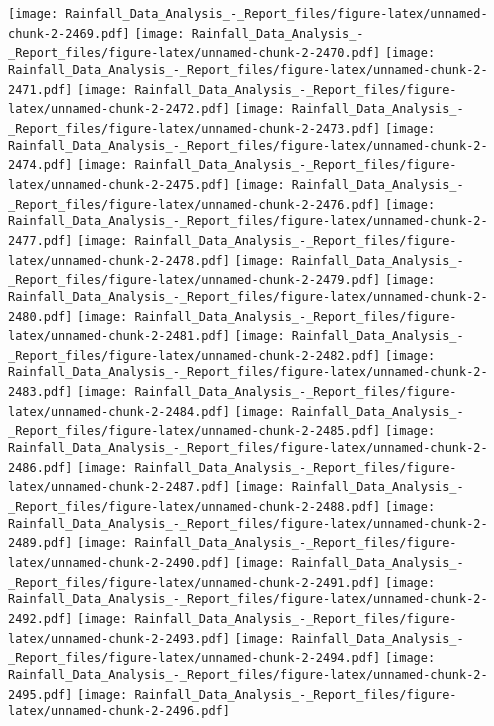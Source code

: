 \documentclass[
]{article}
\begin{document}
\texttt{[image: Rainfall\_Data\_Analysis\_-\_Report\_files/figure-latex/unnamed-chunk-2-2469.pdf]}
\texttt{[image: Rainfall\_Data\_Analysis\_-\_Report\_files/figure-latex/unnamed-chunk-2-2470.pdf]}
\texttt{[image: Rainfall\_Data\_Analysis\_-\_Report\_files/figure-latex/unnamed-chunk-2-2471.pdf]}
\texttt{[image: Rainfall\_Data\_Analysis\_-\_Report\_files/figure-latex/unnamed-chunk-2-2472.pdf]}
\texttt{[image: Rainfall\_Data\_Analysis\_-\_Report\_files/figure-latex/unnamed-chunk-2-2473.pdf]}
\texttt{[image: Rainfall\_Data\_Analysis\_-\_Report\_files/figure-latex/unnamed-chunk-2-2474.pdf]}
\texttt{[image: Rainfall\_Data\_Analysis\_-\_Report\_files/figure-latex/unnamed-chunk-2-2475.pdf]}
\texttt{[image: Rainfall\_Data\_Analysis\_-\_Report\_files/figure-latex/unnamed-chunk-2-2476.pdf]}
\texttt{[image: Rainfall\_Data\_Analysis\_-\_Report\_files/figure-latex/unnamed-chunk-2-2477.pdf]}
\texttt{[image: Rainfall\_Data\_Analysis\_-\_Report\_files/figure-latex/unnamed-chunk-2-2478.pdf]}
\texttt{[image: Rainfall\_Data\_Analysis\_-\_Report\_files/figure-latex/unnamed-chunk-2-2479.pdf]}
\texttt{[image: Rainfall\_Data\_Analysis\_-\_Report\_files/figure-latex/unnamed-chunk-2-2480.pdf]}
\texttt{[image: Rainfall\_Data\_Analysis\_-\_Report\_files/figure-latex/unnamed-chunk-2-2481.pdf]}
\texttt{[image: Rainfall\_Data\_Analysis\_-\_Report\_files/figure-latex/unnamed-chunk-2-2482.pdf]}
\texttt{[image: Rainfall\_Data\_Analysis\_-\_Report\_files/figure-latex/unnamed-chunk-2-2483.pdf]}
\texttt{[image: Rainfall\_Data\_Analysis\_-\_Report\_files/figure-latex/unnamed-chunk-2-2484.pdf]}
\texttt{[image: Rainfall\_Data\_Analysis\_-\_Report\_files/figure-latex/unnamed-chunk-2-2485.pdf]}
\texttt{[image: Rainfall\_Data\_Analysis\_-\_Report\_files/figure-latex/unnamed-chunk-2-2486.pdf]}
\texttt{[image: Rainfall\_Data\_Analysis\_-\_Report\_files/figure-latex/unnamed-chunk-2-2487.pdf]}
\texttt{[image: Rainfall\_Data\_Analysis\_-\_Report\_files/figure-latex/unnamed-chunk-2-2488.pdf]}
\texttt{[image: Rainfall\_Data\_Analysis\_-\_Report\_files/figure-latex/unnamed-chunk-2-2489.pdf]}
\texttt{[image: Rainfall\_Data\_Analysis\_-\_Report\_files/figure-latex/unnamed-chunk-2-2490.pdf]}
\texttt{[image: Rainfall\_Data\_Analysis\_-\_Report\_files/figure-latex/unnamed-chunk-2-2491.pdf]}
\texttt{[image: Rainfall\_Data\_Analysis\_-\_Report\_files/figure-latex/unnamed-chunk-2-2492.pdf]}
\texttt{[image: Rainfall\_Data\_Analysis\_-\_Report\_files/figure-latex/unnamed-chunk-2-2493.pdf]}
\texttt{[image: Rainfall\_Data\_Analysis\_-\_Report\_files/figure-latex/unnamed-chunk-2-2494.pdf]}
\texttt{[image: Rainfall\_Data\_Analysis\_-\_Report\_files/figure-latex/unnamed-chunk-2-2495.pdf]}
\texttt{[image: Rainfall\_Data\_Analysis\_-\_Report\_files/figure-latex/unnamed-chunk-2-2496.pdf]}
\end{document}

